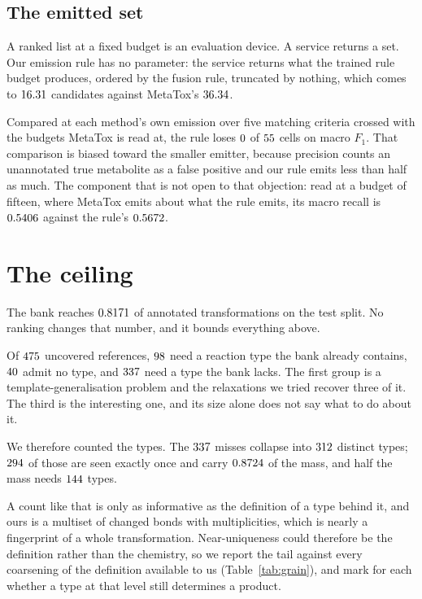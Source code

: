\documentclass[11pt]{article}
\begin{document}
\subsection{The emitted set}

A ranked list at a fixed budget is an evaluation device. A service returns a set. Our emission rule
has no parameter: the service returns what the trained rule budget produces, ordered by the fusion
rule, truncated by nothing, which comes to $16.31$ candidates against MetaTox's
$36.34$.

Compared at each method's own emission over five matching criteria crossed with the budgets MetaTox
is read at, the rule loses $0$ of $55$ cells on macro $F_1$. That
comparison is biased toward the smaller emitter, because precision counts an unannotated true
metabolite as a false positive and our rule emits less than half as much. The component that is not
open to that objection: read at a budget of fifteen, where MetaTox emits about what the rule emits,
its macro recall is $0.5406$ against the rule's
$0.5672$.

\section{The ceiling}

The bank reaches $0.8171$ of annotated transformations on the test split. No ranking
changes that number, and it bounds everything above.

Of $475$ uncovered references, $98$ need a reaction type the bank
already contains, $40$ admit no type, and $337$ need a type the
bank lacks. The first group is a template-generalisation problem and the relaxations we tried
recover three of it. The third is the interesting one, and its size alone does not say what to do
about it.

We therefore counted the types. The $337$ misses collapse into $312$
distinct types; $294$ of those are seen exactly once and carry $0.8724$ of
the mass, and half the mass needs $144$ types.

A count like that is only as informative as the definition of a type behind it, and ours is a
multiset of changed bonds with multiplicities, which is nearly a fingerprint of a whole
transformation. Near-uniqueness could therefore be the definition rather than the chemistry, so we
report the tail against every coarsening of the definition available to us
(Table~\ref{tab:grain}), and mark for each whether a type at that level still determines a
product.
\end{document}
